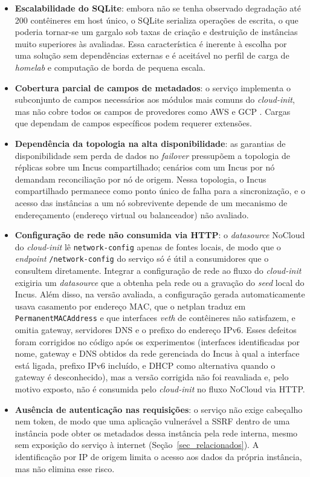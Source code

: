 \begin{itemize}
    \item \textbf{Escalabilidade do SQLite}: embora não se tenha observado degradação até 200 contêineres em host único, o SQLite serializa operações de escrita, o que poderia tornar-se um gargalo sob taxas de criação e destruição de instâncias muito superiores às avaliadas. Essa característica é inerente à escolha por uma solução sem dependências externas e é aceitável no perfil de carga de \textit{homelab} e computação de borda de pequena escala.

    \item \textbf{Cobertura parcial de campos de metadados}: o serviço implementa o subconjunto de campos necessários aos módulos mais comuns do \textit{cloud-init}, mas não cobre todos os campos de provedores como AWS e GCP \citep{aws_imds, gcp_metadata}. Cargas que dependam de campos específicos podem requerer extensões.

    \item \textbf{Dependência da topologia na alta disponibilidade}: as garantias de disponibilidade sem perda de dados no \textit{failover} pressupõem a topologia de réplicas sobre um Incus compartilhado; cenários com um Incus por nó demandam reconciliação por nó de origem. Nessa topologia, o Incus compartilhado permanece como ponto único de falha para a sincronização, e o acesso das instâncias a um nó sobrevivente depende de um mecanismo de endereçamento (endereço virtual ou balanceador) não avaliado.

    \item \textbf{Configuração de rede não consumida via HTTP}: o \textit{datasource} NoCloud do \textit{cloud-init} lê \texttt{network-config} apenas de fontes locais, de modo que o \textit{endpoint} \texttt{/network-config} do serviço só é útil a consumidores que o consultem diretamente. Integrar a configuração de rede ao fluxo do \textit{cloud-init} exigiria um \textit{datasource} que a obtenha pela rede ou a gravação do \textit{seed} local do Incus. Além disso, na versão avaliada, a configuração gerada automaticamente usava casamento por endereço MAC, que o netplan traduz em \texttt{PermanentMACAddress} e que interfaces \textit{veth} de contêineres não satisfazem, e omitia gateway, servidores DNS e o prefixo do endereço IPv6. Esses defeitos foram corrigidos no código após os experimentos (interfaces identificadas por nome, gateway e DNS obtidos da rede gerenciada do Incus à qual a interface está ligada, prefixo IPv6 incluído, e DHCP como alternativa quando o gateway é desconhecido), mas a versão corrigida não foi reavaliada e, pelo motivo exposto, não é consumida pelo \textit{cloud-init} no fluxo NoCloud via HTTP.

    \item \textbf{Ausência de autenticação nas requisições}: o serviço não exige cabeçalho nem token, de modo que uma aplicação vulnerável a SSRF dentro de uma instância pode obter os metadados dessa instância pela rede interna, mesmo sem exposição do serviço à internet (Seção~\ref{sec_relacionados}). A identificação por IP de origem limita o acesso aos dados da própria instância, mas não elimina esse risco.
\end{itemize}

